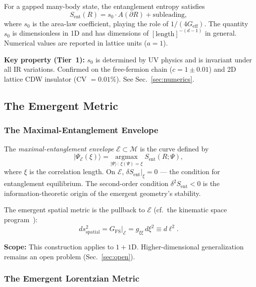 \documentclass[aps,prd,twocolumn,superscriptaddress,nofootinbib,floatfix]{revtex4-2}
\newcommand{\sn}{s_0}
\newcommand{\Geff}{G_{\mathrm{eff}}}
\newcommand{\Sent}{S_{\mathrm{ent}}}
\begin{document}
For a gapped many-body state, the entanglement entropy satisfies~\cite{Hastings2007,EisertCramerPlenio2010}
\begin{equation}
\label{eq:arealaw}
\Sent(R) = \sn \cdot A(\partial R) + \text{subleading},
\end{equation}
where $\sn$ is the area-law coefficient, playing the role of $1/(4\Geff)$. The quantity $\sn$ is dimensionless in 1D and has dimensions of $[\text{length}]^{-(d-1)}$ in general. Numerical values are reported in lattice units ($a = 1$).

\textbf{Key property (Tier~1):} $\sn$ is determined by UV physics and is invariant under all IR variations. Confirmed on the free-fermion chain ($c = 1 \pm 0.01$) and 2D lattice CDW insulator (CV $= 0.01\%$). See Sec.~\ref{sec:numerics}.

\subsection{The Emergent Metric}
\label{sec:emergent_metric}

\subsubsection{The Maximal-Entanglement Envelope}

The \emph{maximal-entanglement envelope} $\mathcal{E} \subset \mathcal{M}$ is the curve defined by
\begin{equation}
|\Psi_{\mathcal{E}}(\xi)\rangle = \underset{|\Psi\rangle\,:\,\xi(\Psi)=\xi}{\mathrm{argmax}}\; \Sent(R;\Psi),
\end{equation}
where $\xi$ is the correlation length. On $\mathcal{E}$, $\delta\Sent|_\xi = 0$ --- the condition for entanglement equilibrium. The second-order condition $\delta^2\Sent < 0$ is the information-theoretic origin of the emergent geometry's stability.

The emergent spatial metric is the pullback to $\mathcal{E}$ (cf.\ the kinematic space program~\cite{Czech2016,NozakiRyuTakayanagi2012}):
\begin{equation}
ds^2_{\mathrm{spatial}} = G_{\mathrm{FS}}\big|_{\mathcal{E}} = g_{\xi\xi}\,d\xi^2 \equiv d\ell^2.
\end{equation}

\textbf{Scope:} This construction applies to $1{+}1$D. Higher-dimensional generalization remains an open problem (Sec.~\ref{sec:open}).

\subsubsection{The Emergent Lorentzian Metric}
\end{document}
